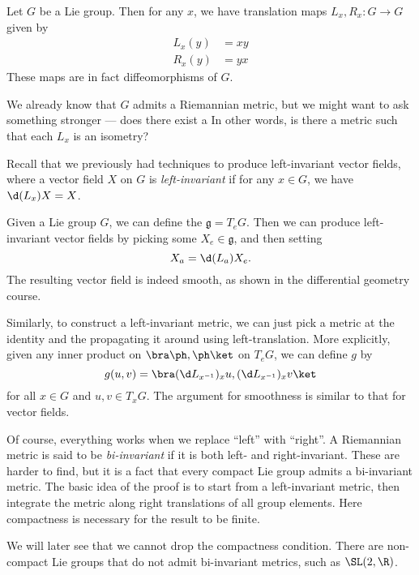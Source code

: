 \documentclass[a4paper]{article}
\begin{document}
\begin{eg}
  Let $G$ be a Lie group. Then for any $x$, we have translation maps $L_x, R_x: G \to G$ given by
  \begin{align*}
    L_x(y) &= xy\\
    R_x(y) &= yx
  \end{align*}
  These maps are in fact diffeomorphisms of $G$.

  We already know that $G$ admits a Riemannian metric, but we might want to ask something stronger --- does there exist a  In other words, is there a metric such that each $L_x$ is an isometry?

  Recall that we previously had techniques to produce left-invariant vector fields, where a vector field $X$ on $G$ is \emph{left-invariant} if for any $x \in G$, we have $\d (L_x) X = X$.

  Given a Lie group $G$, we can define the  $\mathfrak{g} = T_e G$. Then we can produce left-invariant vector fields by picking some $X_e \in \mathfrak{g}$, and then setting
  \[
    X_a = \d (L_a) X_e.
  \]
  The resulting vector field is indeed smooth, as shown in the differential geometry course.

  Similarly, to construct a left-invariant metric, we can just pick a metric at the identity and the propagating it around using left-translation. More explicitly, given any inner product on $\bra \ph, \ph\ket$ on $T_eG$, we can define $g$ by
  \[
    g(u, v) = \bra (\d L_{x^{-1}})_x u, (\d L_{x^{-1}})_x v\ket
  \]
  for all $x \in G$ and $u, v \in T_x G$. The argument for smoothness is similar to that for vector fields.
\end{eg}
Of course, everything works when we replace ``left'' with ``right''. A Riemannian metric is said to be \emph{bi-invariant} if it is both left- and right-invariant. These are harder to find, but it is a fact that every compact Lie group admits a bi-invariant metric. The basic idea of the proof is to start from a left-invariant metric, then integrate the metric along right translations of all group elements. Here compactness is necessary for the result to be finite.

We will later see that we cannot drop the compactness condition. There are non-compact Lie groups that do not admit bi-invariant metrics, such as $\SL(2, \R)$.
\end{document}
